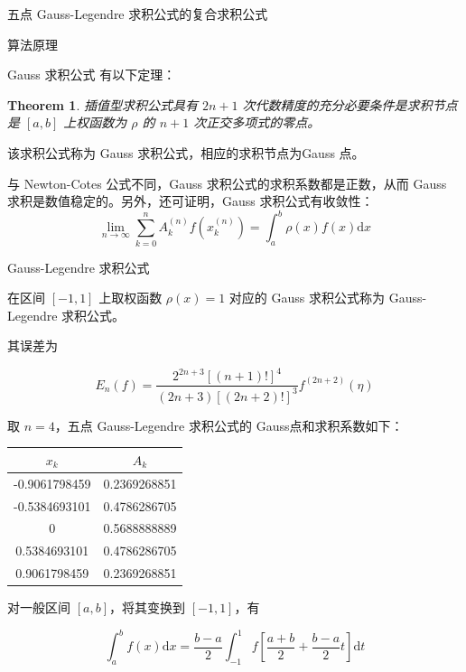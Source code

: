 \documentclass[a4paper]{article}
\newtheorem{myThm}{Theorem}
\begin{document}
\begin{multicols}{2}
\begin{section}{五点 Gauss-Legendre 求积公式的复合求积公式}
\begin{subsection}{算法原理}
\begin{subsubsection}{Gauss 求积公式}
			有以下定理：
			
			\begin{myThm}
				
				插值型求积公式具有 $2n+1$ 次代数精度的充分必要条件是求积节点是 $[a,b]$ 上权函数为 $\rho$ 的 $n+1$ 次正交多项式的零点。

			\end{myThm}

			
			该求积公式称为 Gauss 求积公式，相应的求积节点为Gauss 点。
			
			与 Newton-Cotes 公式不同，Gauss 求积公式的求积系数都是正数，从而 Gauss 求积是数值稳定的。另外，还可证明，Gauss 求积公式有收敛性： $$\lim _{n \rightarrow \infty} \sum_{k=0}^{n} A_{k}^{(n)} f\left(x_{k}^{(n)}\right) =\int_{a}^{b} \rho(x) f(x) \mathrm{d} x $$
			
		\end{subsubsection}
		
		\begin{subsubsection}{Gauss-Legendre 求积公式}
		
			在区间 $[-1,1]$ 上取权函数 $\rho(x) = 1$ 对应的 Gauss 求积公式称为 Gauss-Legendre 求积公式。
			
			其误差为
			
			$$E_{n}(f)=\frac{2^{2 n+3}[(n+1) !]^{4}}{(2 n+3)[(2 n+2) !]^{3}} f^{(2 n+2)}(\eta)$$
			
			取 $n=4$，五点 Gauss-Legendre 求积公式的 Gauss点和求积系数如下：
			
			\begin{table}[H]
			\centering
			\begin{tabular}{c|c}
			\hline
			\multicolumn{1}{c|}{$x_k$} & \multicolumn{1}{c}{$A_k$}        
			\\ \hline
			-0.9061798459 & 0.2369268851 \\
			-0.5384693101 & 0.4786286705 \\
			0 & 0.5688888889 \\
			0.5384693101 & 0.4786286705 \\
			0.9061798459 & 0.2369268851 \\ 
			\hline
			\end{tabular}
			\end{table}
			
			对一般区间 $[a,b]$，将其变换到 $[-1,1]$，有
			
			$$\int_{a}^{b} f(x) \mathrm{d} x=\frac{b-a}{2} \int_{-1}^{1} f\left[\frac{a+b}{2}+\frac{b-a}{2} t\right] \mathrm{d} t$$
			
		\end{subsubsection}
		

\end{subsection}
\end{section}
\end{multicols}
\end{document}
